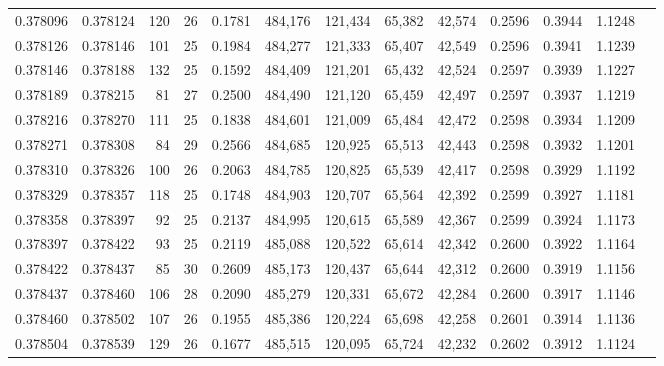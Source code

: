 \begin{tabular}{rrrrrrrrrrrrr}
0.378096 & 0.378124 &   120 &  26 &                                     0.1781 & 484,176 & 121,434 &  65,382 &  42,574 & 0.2596 & 0.3944 & 1.1248 \\
0.378126 & 0.378146 &   101 &  25 &                                     0.1984 & 484,277 & 121,333 &  65,407 &  42,549 & 0.2596 & 0.3941 & 1.1239 \\
0.378146 & 0.378188 &   132 &  25 &                                     0.1592 & 484,409 & 121,201 &  65,432 &  42,524 & 0.2597 & 0.3939 & 1.1227 \\
0.378189 & 0.378215 &    81 &  27 &                                     0.2500 & 484,490 & 121,120 &  65,459 &  42,497 & 0.2597 & 0.3937 & 1.1219 \\
0.378216 & 0.378270 &   111 &  25 &                                     0.1838 & 484,601 & 121,009 &  65,484 &  42,472 & 0.2598 & 0.3934 & 1.1209 \\
0.378271 & 0.378308 &    84 &  29 &                                     0.2566 & 484,685 & 120,925 &  65,513 &  42,443 & 0.2598 & 0.3932 & 1.1201 \\
0.378310 & 0.378326 &   100 &  26 &                                     0.2063 & 484,785 & 120,825 &  65,539 &  42,417 & 0.2598 & 0.3929 & 1.1192 \\
0.378329 & 0.378357 &   118 &  25 &                                     0.1748 & 484,903 & 120,707 &  65,564 &  42,392 & 0.2599 & 0.3927 & 1.1181 \\
0.378358 & 0.378397 &    92 &  25 &                                     0.2137 & 484,995 & 120,615 &  65,589 &  42,367 & 0.2599 & 0.3924 & 1.1173 \\
0.378397 & 0.378422 &    93 &  25 &                                     0.2119 & 485,088 & 120,522 &  65,614 &  42,342 & 0.2600 & 0.3922 & 1.1164 \\
0.378422 & 0.378437 &    85 &  30 &                                     0.2609 & 485,173 & 120,437 &  65,644 &  42,312 & 0.2600 & 0.3919 & 1.1156 \\
0.378437 & 0.378460 &   106 &  28 &                                     0.2090 & 485,279 & 120,331 &  65,672 &  42,284 & 0.2600 & 0.3917 & 1.1146 \\
0.378460 & 0.378502 &   107 &  26 &                                     0.1955 & 485,386 & 120,224 &  65,698 &  42,258 & 0.2601 & 0.3914 & 1.1136 \\
0.378504 & 0.378539 &   129 &  26 &                                     0.1677 & 485,515 & 120,095 &  65,724 &  42,232 & 0.2602 & 0.3912 & 1.1124 \\

\end{tabular}
